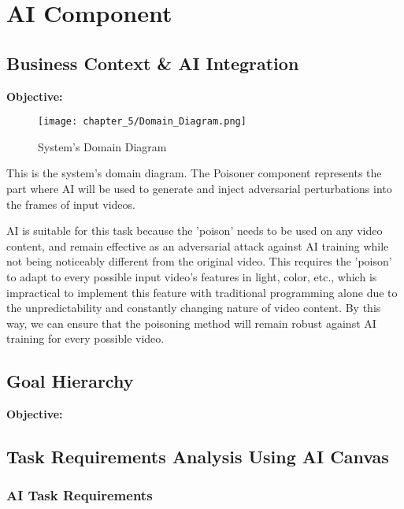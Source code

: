 \chapter{AI Component}
\label{chap:ai-component}

\section{Business Context & AI Integration}
\label{section:business-context-and-AI-integration}
\textbf{Objective:}

\begin{figure}[h]
    \centering
    \texttt{[image: chapter\_5/Domain\_Diagram.png]}
    \caption{System's Domain Diagram}
\end{figure}

This is the system's domain diagram. The Poisoner component represents the part where AI will be used to generate and inject adversarial perturbations into the frames of input videos.

AI is suitable for this task because the 'poison' needs to be used on any video content, and remain effective as an adversarial attack against AI training while not being noticeably different from the original video.
This requires the 'poison' to adapt to every possible input video’s features in light, color, etc., which is impractical to implement this feature with traditional programming alone due to the unpredictability and constantly changing nature of video content. By this way, we can ensure that the poisoning method will remain robust against AI training for every possible video.

\section{Goal Hierarchy}
\label{section:goal-hierarchy}
\textbf{Objective:}

\section{Task Requirements Analysis Using AI Canvas}
\label{section:task-requirements-analysis-using-AI-canvas}
\subsection{AI Task Requirements}


